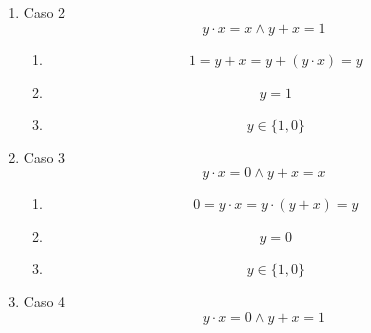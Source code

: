 \documentclass[
]{article}
\providecommand{\tightlist}{%
  \setlength{\itemsep}{0pt}\setlength{\parskip}{0pt}}
\begin{document}
\begin{enumerate}
\begin{enumerate}
\begin{enumerate}
\begin{enumerate}
        \begin{enumerate}
        \def\labelenumv{\arabic{enumv}.}
        \tightlist
        \item
          \[{{1 = {{({y \cdot x})} + {({\overline{y} \cdot \overline{x}})}}} = y} \odot x\]
        \item
          \[y = x\]
        \item
          \[y \in {\{{x,\overline{x}}\}}\]
        \end{enumerate}
      \item
        Caso 2 \[{{y \cdot x} = {{x \land y} + x}} = 1\]

        \begin{enumerate}
        \def\labelenumv{\arabic{enumv}.}
        \tightlist
        \item
          \[{{1 = {y + x}} = {y + {({y \cdot x})}}} = y\]
        \item
          \[y = 1\]
        \item
          \[y \in {\{ 1,0\}}\]
        \end{enumerate}
      \item
        Caso 3 \[{{y \cdot x} = {{0 \land y} + x}} = x\]

        \begin{enumerate}
        \def\labelenumv{\arabic{enumv}.}
        \tightlist
        \item
          \[{{0 = {y \cdot x}} = {y \cdot {({y + x})}}} = y\]
        \item
          \[y = 0\]
        \item
          \[y \in {\{ 1,0\}}\]
        \end{enumerate}
      \item
        Caso 4 \[{{y \cdot x} = {{0 \land y} + x}} = 1\]


\end{enumerate}
\end{enumerate}
\end{enumerate}
\end{enumerate}
\end{document}
